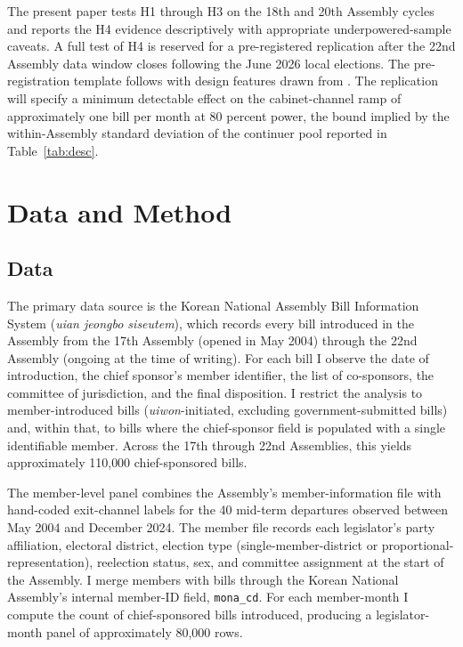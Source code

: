 \documentclass[11pt]{article}
\begin{document}
The present paper tests H1 through H3 on the 18th and 20th Assembly cycles and reports the H4 evidence descriptively with appropriate underpowered-sample caveats. A full test of H4 is reserved for a pre-registered replication after the 22nd Assembly data window closes following the June 2026 local elections. The pre-registration template follows \citet{ofosu2021} with design features drawn from \citet{monogan2015}. The replication will specify a minimum detectable effect on the cabinet-channel ramp of approximately one bill per month at 80 percent power, the bound implied by the within-Assembly standard deviation of the continuer pool reported in Table~\ref{tab:desc}.

\section{Data and Method}

\subsection{Data}

The primary data source is the Korean National Assembly Bill Information System (\textit{uian jeongbo siseutem}), which records every bill introduced in the Assembly from the 17th Assembly (opened in May 2004) through the 22nd Assembly (ongoing at the time of writing). For each bill I observe the date of introduction, the chief sponsor's member identifier, the list of co-sponsors, the committee of jurisdiction, and the final disposition. I restrict the analysis to member-introduced bills (\textit{uiwon}-initiated, excluding government-submitted bills) and, within that, to bills where the chief-sponsor field is populated with a single identifiable member. Across the 17th through 22nd Assemblies, this yields approximately 110{,}000 chief-sponsored bills.

The member-level panel combines the Assembly's member-information file with hand-coded exit-channel labels for the 40 mid-term departures observed between May 2004 and December 2024. The member file records each legislator's party affiliation, electoral district, election type (single-member-district or proportional-representation), reelection status, sex, and committee assignment at the start of the Assembly. I merge members with bills through the Korean National Assembly's internal member-ID field, \texttt{mona\_cd}. For each member-month I compute the count of chief-sponsored bills introduced, producing a legislator-month panel of approximately 80{,}000 rows.
\end{document}
